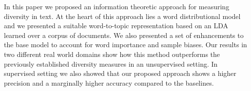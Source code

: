 In this paper we proposed an information theoretic approach for measuring diversity in text. At the heart of this approach lies a word distributional model and we presented a suitable word-to-topic representation based on an LDA learned over a corpus of documents. We also presented a set of enhancements to the base model to account for word importance and sample biases. Our results in two different real world domains show how this method outperforms the previously established  diversity measures in an unsupervised setting. In supervised setting we also showed that our proposed approach shows a higher precision and a marginally higher accuracy compared to the baselines.
